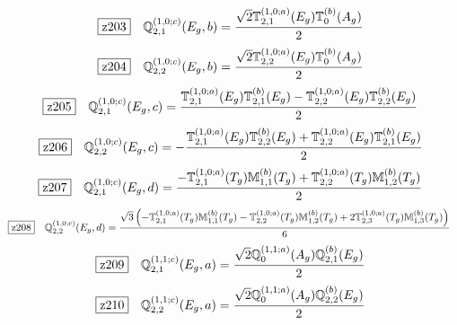 \documentclass[fleqn,10pt,landscape]{jsarticle}
\begin{document}
\begin{dmath*}
\hspace*{3mm}\fbox{z203}\quad \mathbb{Q}_{2,1}^{(1,0;c)}(E_{g},b)=\frac{\sqrt{2} \mathbb{T}_{2,1}^{(1,0;a)}(E_{g}) \mathbb{T}_{0}^{(b)}(A_{g})}{2}
\end{dmath*}
\begin{dmath*}
\hspace*{3mm}\fbox{z204}\quad \mathbb{Q}_{2,2}^{(1,0;c)}(E_{g},b)=\frac{\sqrt{2} \mathbb{T}_{2,2}^{(1,0;a)}(E_{g}) \mathbb{T}_{0}^{(b)}(A_{g})}{2}
\end{dmath*}
\begin{dmath*}
\hspace*{3mm}\fbox{z205}\quad \mathbb{Q}_{2,1}^{(1,0;c)}(E_{g},c)=\frac{\mathbb{T}_{2,1}^{(1,0;a)}(E_{g}) \mathbb{T}_{2,1}^{(b)}(E_{g}) - \mathbb{T}_{2,2}^{(1,0;a)}(E_{g}) \mathbb{T}_{2,2}^{(b)}(E_{g})}{2}
\end{dmath*}
\begin{dmath*}
\hspace*{3mm}\fbox{z206}\quad \mathbb{Q}_{2,2}^{(1,0;c)}(E_{g},c)=- \frac{\mathbb{T}_{2,1}^{(1,0;a)}(E_{g}) \mathbb{T}_{2,2}^{(b)}(E_{g}) + \mathbb{T}_{2,2}^{(1,0;a)}(E_{g}) \mathbb{T}_{2,1}^{(b)}(E_{g})}{2}
\end{dmath*}
\begin{dmath*}
\hspace*{3mm}\fbox{z207}\quad \mathbb{Q}_{2,1}^{(1,0;c)}(E_{g},d)=\frac{- \mathbb{T}_{2,1}^{(1,0;a)}(T_{g}) \mathbb{M}_{1,1}^{(b)}(T_{g}) + \mathbb{T}_{2,2}^{(1,0;a)}(T_{g}) \mathbb{M}_{1,2}^{(b)}(T_{g})}{2}
\end{dmath*}
\begin{dmath*}
\hspace*{3mm}\fbox{z208}\quad \mathbb{Q}_{2,2}^{(1,0;c)}(E_{g},d)=\frac{\sqrt{3} \left(- \mathbb{T}_{2,1}^{(1,0;a)}(T_{g}) \mathbb{M}_{1,1}^{(b)}(T_{g}) - \mathbb{T}_{2,2}^{(1,0;a)}(T_{g}) \mathbb{M}_{1,2}^{(b)}(T_{g}) + 2 \mathbb{T}_{2,3}^{(1,0;a)}(T_{g}) \mathbb{M}_{1,3}^{(b)}(T_{g})\right)}{6}
\end{dmath*}
\begin{dmath*}
\hspace*{3mm}\fbox{z209}\quad \mathbb{Q}_{2,1}^{(1,1;c)}(E_{g},a)=\frac{\sqrt{2} \mathbb{Q}_{0}^{(1,1;a)}(A_{g}) \mathbb{Q}_{2,1}^{(b)}(E_{g})}{2}
\end{dmath*}
\begin{dmath*}
\hspace*{3mm}\fbox{z210}\quad \mathbb{Q}_{2,2}^{(1,1;c)}(E_{g},a)=\frac{\sqrt{2} \mathbb{Q}_{0}^{(1,1;a)}(A_{g}) \mathbb{Q}_{2,2}^{(b)}(E_{g})}{2}
\end{dmath*}
\end{document}

